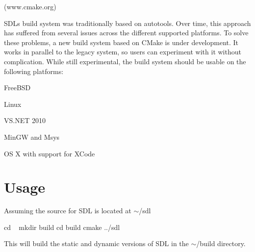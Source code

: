 (www.\+cmake.\+org)

S\+DL\textquotesingle{}s build system was traditionally based on autotools. Over time, this approach has suffered from several issues across the different supported platforms. To solve these problems, a new build system based on C\+Make is under development. It works in parallel to the legacy system, so users can experiment with it without complication. While still experimental, the build system should be usable on the following platforms\+:


\begin{DoxyItemize}
\item Free\+B\+SD
\item Linux
\item V\+S.\+N\+ET 2010
\item Min\+GW and Msys
\item OS X with support for X\+Code
\end{DoxyItemize}



 \section*{Usage }

Assuming the source for S\+DL is located at $\sim$/sdl \begin{DoxyVerb}cd ~
mkdir build
cd build
cmake ../sdl
\end{DoxyVerb}


This will build the static and dynamic versions of S\+DL in the $\sim$/build directory. 